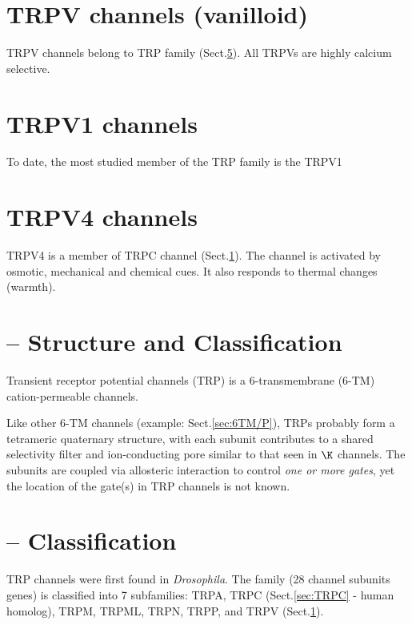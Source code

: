\section{TRPV channels (vanilloid)}
\label{sec:TRPV-channel}

TRPV channels belong to TRP family (Sect.\ref{sec:TRP-classification}).
All TRPVs are highly calcium selective.
 		
\section{TRPV1 channels}
\label{sec:TRPV1-channel}

To date, the most studied member of the TRP family is the TRPV1 

\section{TRPV4 channels}
\label{sec:TRPV4-channel}

TRPV4 is a member of TRPC channel (Sect.\ref{sec:TRPV-channel}).
The channel is activated by osmotic, mechanical and chemical cues. It also
responds to thermal changes (warmth). 


\section{ -- Structure and Classification}
\label{sec:TRP-structure}

Transient receptor potential channels (TRP) is a 6-transmembrane (6-TM)
cation-permeable channels. 

Like other 6-TM channels (example: Sect.\ref{sec:6TM/P}), TRPs probably form a
tetrameric quaternary structure, with each subunit contributes to a shared
selectivity filter and ion-conducting pore similar to that seen in $\K$
channels. The subunits are coupled via allosteric interaction to control {\it
one or more gates}, yet the location of the gate(s) in TRP channels is not
known.


\section{ -- Classification}
\label{sec:TRP-classification}

TRP channels were first found in {\it Drosophila}.
The family (28 channel subunits genes) is classified into 7 subfamilies: TRPA,
TRPC (Sect.\ref{sec:TRPC} - human homolog), TRPM, TRPML, TRPN, TRPP, and TRPV
(Sect.\ref{sec:TRPV-channel}).

